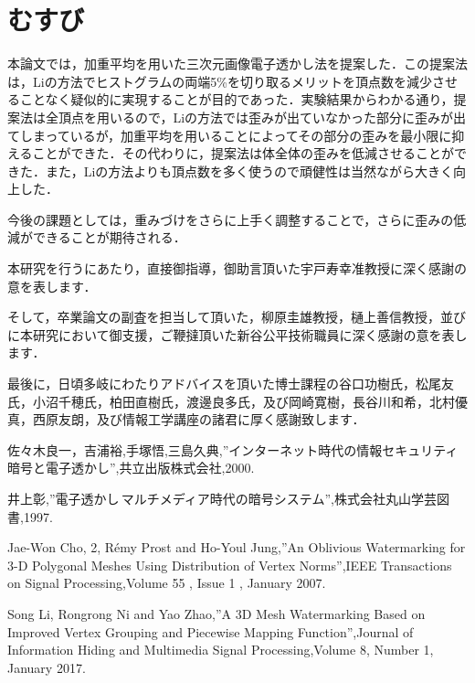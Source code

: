 \documentclass[11pt]{jreport}
\begin{document}
{\chapter{むすび}
本論文では，加重平均を用いた三次元画像電子透かし法を提案した．この提案法は，Liの方法でヒストグラムの両端5\%を切り取るメリットを頂点数を減少させることなく疑似的に実現することが目的であった．実験結果からわかる通り，提案法は全頂点を用いるので，Liの方法では歪みが出ていなかった部分に歪みが出てしまっているが，加重平均を用いることによってその部分の歪みを最小限に抑えることができた．その代わりに，提案法は体全体の歪みを低減させることができた．また，Liの方法よりも頂点数を多く使うので頑健性は当然ながら大きく向上した．\par
今後の課題としては，重みづけをさらに上手く調整することで，さらに歪みの低減ができることが期待される．


 \begin{acknowledgements}
 本研究を行うにあたり，直接御指導，御助言頂いた宇戸寿幸准教授に深く感謝の意を表します．\par
そして，卒業論文の副査を担当して頂いた，柳原圭雄教授，樋上善信教授，並びに本研究において御支援，ご鞭撻頂いた新谷公平技術職員に深く感謝の意を表します．\par
最後に，日頃多岐にわたりアドバイスを頂いた博士課程の谷口功樹氏，松尾友氏，小沼千穂氏，柏田直樹氏，渡邊良多氏，及び岡崎寛樹，長谷川和希，北村優真，西原友朗，及び情報工学講座の諸君に厚く感謝致します．
 \end{acknowledgements}
\thispagestyle{plain}



\begin{thebibliography}{99}
佐々木良一，吉浦裕,手塚悟,三島久典,”インターネット時代の情報セキュリティ\,暗号と電子透かし”,共立出版株式会社,2000.

井上彰,”電子透かし\,マルチメディア時代の暗号システム”,株式会社丸山学芸図書,1997.

Jae-Won Cho, 2, Rémy Prost and Ho-Youl Jung,”An Oblivious Watermarking for 3-D Polygonal Meshes
Using Distribution of Vertex Norms”,IEEE Transactions on Signal Processing,Volume 55 , Issue 1 , January 2007.

Song Li, Rongrong Ni and Yao Zhao,”A 3D Mesh Watermarking Based on Improved
Vertex Grouping and Piecewise Mapping Function”,Journal of Information Hiding and Multimedia Signal Processing,Volume 8, Number 1, January 2017.



\end{thebibliography}}
\end{document}
